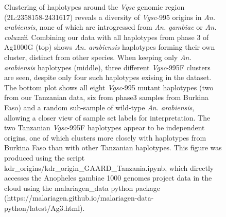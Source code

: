 \documentclass[a4paper,12pt]{article}
\begin{document}
\begin{figure}[h]
	\caption{\footnotesize Clustering of haplotypes around the \textit{Vgsc} genomic region (2L:2358158-2431617) reveals a diversity of \textit{Vgsc}-995 origins in \textit{An. arabiensis}, none of which are introgressed from \textit{An. gambiae} or \textit{An. coluzzii}. Combining our data with all haplotypes from phase 3 of Ag1000G (top) shows \textit{An. arabiensis} haplotypes forming their own cluster, distinct from other species. When keeping only \textit{An. arabiensis} haplotypes (middle), three different \textit{Vgsc}-995F clusters are seen, despite only four such haplotypes exising in the dataset. The bottom plot shows all eight \textit{Vgsc}-995 mutant haplotypes (two from our Tanzanian data, six from phase3 samples from Burkina Faso) and a random sub-sample of wild-type \textit{An. arabiensis}, allowing a closer view of sample set labels for interpretation. The two Tanzanian \textit{Vgsc}-995F haplotypes appear to be independent origins, one of which clusters more closely with haplotypes from Burkina Faso than with other Tanzanian haplotypes. This figure was produced using the script kdr\_origins/kdr\_origin\_GAARD\_Tanzania.ipynb, which directly accesses the Anopheles gambiae 1000 genomes project data in the cloud using the malariagen\_data python package (https://malariagen.github.io/malariagen-data-python/latest/Ag3.html).}
	\label{FigS8}
\end{figure}


\clearpage
\end{document}
